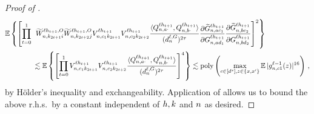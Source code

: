 \begin{proof}[Proof of ]
\begin{align}
        \operatorname*{\mathbb{E}} \left\{
            \left[
                \prod_{t = 0}^{1}
                \right.\right.
                &
                \left.\left.
                \widetilde{W}_{n, k_{2t + 1} i}^{\ell h_{t + 1}, O}
                \widetilde{W}_{n, k_{2t + 2} j}^{\ell h_{t + 1}, O}
                V_{n, c_1 k_{2t + 1}}^{\ell h_{t + 1}}
                V_{n, c_2 k_{2t + 2}}^{\ell h_{t + 1}}
                \frac{
                    \langle
                        Q_{n, a \cdot}^{\ell h_{t + 1}}
                        ,
                        Q_{n, b \cdot}^{\ell h_{t+1}}
                    \rangle
                }{
                    (d_{n}^{\ell, G})^{2\tau}
                }
                \frac{
                    \partial
                    \widetilde{G}_{n, a c_1}^{\ell h_{t + 1}}
                }{
                    \partial
                    G_{n, a d_1}^{\ell h_{t + 1}}
                }
                \frac{
                    \partial
                    \widetilde{G}_{n, b c_2}^{\ell h_{t + 1}}
                }{
                    \partial
                    G_{n, b d_2}^{\ell h_{t + 1}}
                }
            \right]^2
        \right\}
        \nonumber
        \\
        &\lesssim
        \operatorname*{\mathbb{E}} \left\{
            \left[
                \prod_{t = 0}^{1}
                V_{n, c_1 k_{2t + 1}}^{\ell h_{t + 1}}
                V_{n, c_2 k_{2t + 2}}^{\ell h_{t + 1}}
                \frac{
                    \langle
                        Q_{n, a \cdot}^{\ell h_{t + 1}}
                        ,
                        Q_{n, b \cdot}^{\ell h_{t+1}}
                    \rangle
                }{
                    (d_{n}^{\ell, G})^{2\tau}
                }
            \right]^4
        \right\}
        \lesssim
        \operatorname{poly} \left(
            \max_{c \in [d^s] , z \in \{ x, x' \}}
                \operatorname*{\mathbb{E}} | {g}^{\ell - 1}_{n, c 1}{(z)} |^{16}
        \right)
        \, ,
    \end{align}
    by H{\" o}lder's inequality and exchangeability.
    Application of  allows us to bound the above r.h.s.\ by a constant independent of $h, k$ and $n$ as desired.
    

\end{proof}
